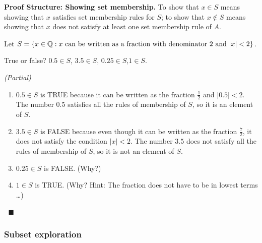\documentclass[11pt]{article}
\newenvironment{task}
	{\begin{mdframed}[linecolor=lightgray, linewidth=3pt]\raggedright}
	{\end{mdframed}}
\newcommand\tn{\textnormal}
\newcommand{\Q}{\mathbb{Q}}
\newcommand\st{:}
\theoremstyle{definition}
\newenvironment{solution}{{\it Solution.} }{\hfill {\color{lightgray}$\blacksquare$}}
\begin{document}
{\bf Proof Structure: Showing set membership.} To show that $x\in S$ means showing that $x$ satisfies set membership rules for $S$; to show that $x\notin S$ means showing that $x$ does not satisfy at least one set membership rule of $A$.

\begin{task}
Let $S=\{ x\in \Q \st x \tn{ can be written as a fraction with denominator 2 and } |x|<2 \}$. 

True or false? \quad\quad $0.5\in S$, \quad\quad $3.5 \in S$, \quad\quad $0.25\in S$,\quad\quad $1\in S$.
\end{task}

\begin{solution}{\it (Partial)}

\vspace*{-8pt}
\begin{enumerate}[label=(\alph*)]
\item $0.5 \in S$ is TRUE because it can be written as the fraction $\frac{1}{2}$ and $|0.5|<2$. The number $0.5$ satisfies all the rules of membership of $S$, so it is an element of $S$.
\item $3.5 \in S$ is FALSE because even though it can be written as the fraction $\frac{7}{2}$, it does not satisfy the condition $|x|<2$. The number $3.5$ does not satisfy all the rules of membership of $S$, so it is not an element of $S$.
\item $0.25\in S$ is FALSE. (Why?)  
\item $1\in S$ is TRUE. (Why? Hint: The fraction does not have to be in lowest terms \dots)
\end{enumerate}

\vspace*{-18pt}$\;$
\end{solution}

\vspace*{-12pt}
\subsubsection{Subset exploration}\label{s: subset exploration}
\end{document}
